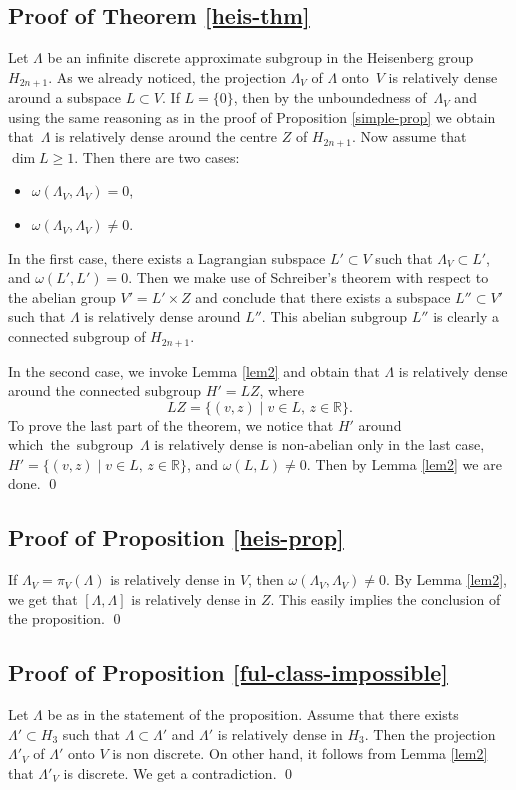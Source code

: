 \documentclass[10pt]{amsart}
\newcommand{\bR}{\mathbb{R}}
\theoremstyle{plain}
\theoremstyle{definition}
\begin{document}
\subsection{Proof of Theorem \ref{heis-thm}}
Let $\Lambda$ be an infinite discrete approximate subgroup in the Heisenberg group $H_{2n+1}$. As we already noticed, the projection $\Lambda_V$ of $\Lambda$ onto~$V$ is relatively dense around a subspace $L \subset V$.
If $L = \{ 0 \}$, then by the unboundedness of~$\Lambda_V$ and using the same reasoning as in the proof of Proposition \ref{simple-prop} we obtain that~$\Lambda$ is relatively dense around the centre $Z$ of $H_{2n+1}$. Now assume that $\dim L \ge 1$. Then there are two cases:

\begin{itemize}
\item[(1)] $\omega(\Lambda_V, \Lambda_V) = 0$,
\item[(2)] $\omega(\Lambda_V,\Lambda_V) \neq 0$.
\end{itemize}

In the first case, there exists a Lagrangian subspace $L' \subset V$ such that $\Lambda_V \subset L'$, and $\omega(L',L') = 0$. Then we make use of Schreiber's theorem with respect to the abelian group $V' = L' \times Z$ and conclude that there exists a subspace $L'' \subset V'$ such that $\Lambda$ is relatively dense around $L''$. This abelian subgroup $L''$ is clearly a connected subgroup of $H_{2n+1}$.

In the second case, we invoke Lemma \ref{lem2} and obtain that $\Lambda$ is relatively dense around the connected subgroup
$H' = LZ$, where
\[
LZ = \{ (v,z) \mid v \in L,\, z \in \bR \}.
\]
To prove the last part of the theorem, we notice that $H'$ around which~the~subgroup~$\Lambda$ is relatively dense is non-abelian only in the last case, \ie \hbox{$H' \!=\!\{ (v,z) \mid v\!\in\!L,\, z\!\in\!\bR \}$}, and $\omega(L,L) \neq 0$. Then by Lemma \ref{lem2} we are done.
\qed

\subsection{Proof of Proposition \ref{heis-prop}} If $\Lambda_V = \pi_V(\Lambda)$ is relatively dense in $V$, then $\omega(\Lambda_V, \Lambda_V) \neq 0$. By Lemma \ref{lem2}, we get that $[\Lambda,\Lambda]$ is relatively dense in $Z$. This easily implies the conclusion of the proposition.
\qed

\subsection{Proof of Proposition \ref{ful-class-impossible}}
Let $\Lambda$ be as in the statement of the proposition. Assume that there exists $\Lambda' \subset H_3$ such that $\Lambda \subset \Lambda'$ and $\Lambda'$ is relatively dense in $H_3$. Then the projection $\Lambda'_V$ of $\Lambda'$ onto $V$ is non discrete. On other hand, it follows from Lemma \ref{lem2} that $\Lambda'_V$ is discrete. We get a contradiction.
\qed
\end{document}
